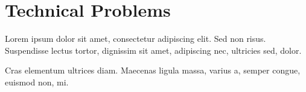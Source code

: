\section{Technical Problems}

Lorem ipsum dolor sit amet, consectetur adipiscing elit. Sed non risus. Suspendisse lectus tortor, dignissim sit amet, adipiscing nec, ultricies sed, dolor.

Cras elementum ultrices diam. Maecenas ligula massa, varius a, semper congue, euismod non, mi.
